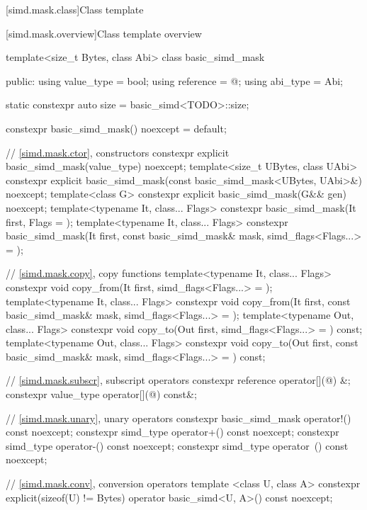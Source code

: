 [simd.mask.class]{Class template }

[simd.mask.overview]{Class template  overview}

\begin{codeblock}
template<size_t Bytes, class Abi> class basic_simd_mask {
public:
  using value_type = bool;
  using reference = @\seebelow@;
  using abi_type = Abi;

  static constexpr auto size = basic_simd<TODO>::size;

  constexpr basic_simd_mask() noexcept = default;

  // \ref{simd.mask.ctor},  constructors
  constexpr explicit basic_simd_mask(value_type) noexcept;
  template<size_t UBytes, class UAbi>
    constexpr explicit basic_simd_mask(const basic_simd_mask<UBytes, UAbi>&) noexcept;
  template<class G> constexpr explicit basic_simd_mask(G&& gen) noexcept;
  template<typename It, class... Flags>
    constexpr basic_simd_mask(It first, Flags = {});
  template<typename It, class... Flags>
    constexpr basic_simd_mask(It first, const basic_simd_mask& mask, simd_flags<Flags...> = {});

  // \ref{simd.mask.copy},  copy functions
  template<typename It, class... Flags>
    constexpr void copy_from(It first, simd_flags<Flags...> = {});
  template<typename It, class... Flags>
    constexpr void copy_from(It first, const basic_simd_mask& mask, simd_flags<Flags...> = {});
  template<typename Out, class... Flags>
    constexpr void copy_to(Out first, simd_flags<Flags...> = {}) const;
  template<typename Out, class... Flags>
    constexpr void copy_to(Out first, const basic_simd_mask& mask, simd_flags<Flags...> = {}) const;

  // \ref{simd.mask.subscr},  subscript operators
  constexpr reference operator[](@\simdsizetype@) &;
  constexpr value_type operator[](@\simdsizetype@) const&;

  // \ref{simd.mask.unary},  unary operators
  constexpr basic_simd_mask operator!() const noexcept;
  constexpr simd_type operator+() const noexcept;
  constexpr simd_type operator-() const noexcept;
  constexpr simd_type operator~() const noexcept;

  // \ref{simd.mask.conv},  conversion operators
  template <class U, class A>
    constexpr explicit(sizeof(U) != Bytes) operator basic_simd<U, A>() const noexcept;

}
\end{codeblock}

